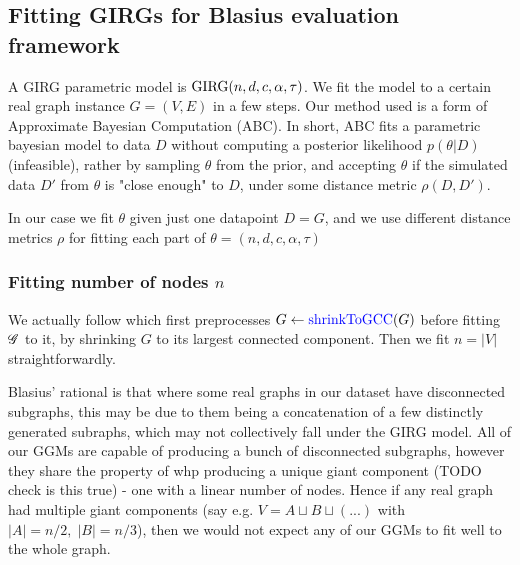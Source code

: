




\subsection{Fitting GIRGs for Blasius evaluation framework}
A GIRG parametric model is $\operatorname{GIRG}(n, d, c, \alpha, \tau)$. We fit the model to a certain real graph instance $G = (V,E)$ in a few steps. Our method used is a form of Approximate Bayesian Computation (ABC). In short, ABC fits a parametric bayesian model to data $D$ without computing a posterior likelihood $p(\theta | D)$ (infeasible), rather by sampling $\theta$ from the prior, and accepting $\theta$ if the simulated data $D'$ from $\theta$ is "close enough" to $D$, under some distance metric $\rho(D, D')$.

In our case we fit $\theta$ given just one datapoint $D = G$, and we use different distance metrics $\rho$ for fitting each part of $\theta = (n, d, c, \alpha, \tau)$

\subsubsection{Fitting number of nodes $n$}

We actually follow \cite{blasius2018towards} which first preprocesses $G \gets \operatorname{\textcolor{blue}{shrinkToGCC}}(G)$ before fitting $\mathscr{G}$ to it, by shrinking $G$ to its largest connected component. Then we fit $n = |V|$ straightforwardly.


Blasius' rational is that where some real graphs in our dataset have disconnected subgraphs, this may be due to them being a concatenation of a few distinctly generated subraphs, which may not collectively fall under the GIRG model. All of our GGMs are capable of producing a bunch of disconnected subgraphs, however they share the property of whp producing a unique giant component (TODO check is this true) - one with a linear number of nodes. Hence if any real graph had multiple giant components (say e.g. $V = A \sqcup B \sqcup (...)$ with $|A| = n/2,\; |B| = n/3$), then we would not expect any of our GGMs to fit well to the whole graph.

